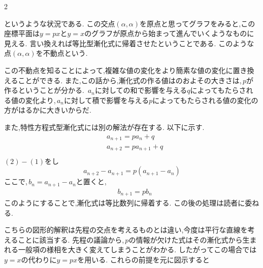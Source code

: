 \documentclass[dvipdfmx,a4paper,11pt,fleqn,openany]{jsbook}
\begin{document}
\begin{multicols*}{2}

    というような状況である.
    この交点$(\alpha,\alpha)$を原点と思ってグラフをみると,この座標平面は$y=px$と$y=x$のグラフが原点から始まって進んでいくようなものに見える.
    言い換えれば等比型漸化式に帰着させたということである.
    このような点$(\alpha,\alpha)$を不動点という.

    この不動点を知ることによって,複雑な値の変化をより簡素な値の変化に置き換えることができる.
    また,この話から,漸化式の作る値はのおよその大きさは,\,$p$が作るということが分かる.
    \,$a_n$に対しての和で影響を与える$q$によってもたらされる値の変化より,\,$a_n$に対して積で影響を与える$p$によってもたらされる値の変化の方がはるかに大きいからだ.

    また,特性方程式型漸化式には別の解法が存在する.
    以下に示す.
    \begin{align*}
      &a_{n+1}=pa_n+q \tag*{\(\cdots\) (1)}\\
      &a_{n+2}=pa_{n+1}+q \tag*{\(\cdots\) (2)}\\
    \end{align*}
    $(2)-(1)$をし
    \[
      a_{n+2}-a_{n+1}=p(a_{n+1}-a_n)
    \]
    ここで,\,$b_n=a_{n+1}-a_n$と置くと,
    \begin{align*}
      &b_{n+1}=pb_n
    \end{align*}
    このようにすることで,漸化式は等比数列に帰着する.
    この後の処理は読者に委ねる.

    こちらの図形的解釈は先程の交点を考えるものとは違い,今度は平行な直線を考えることに該当する.
    先程の議論から,\,$p$の情報が欠けた式はその漸化式から生まれる一般項の様相を大きく変えてしまうことがわかる.
    したがってこの場合では$y=x$の代わりに$y=px$を用いる.
    これらの前提を元に図示すると


\end{multicols*}
\end{document}
